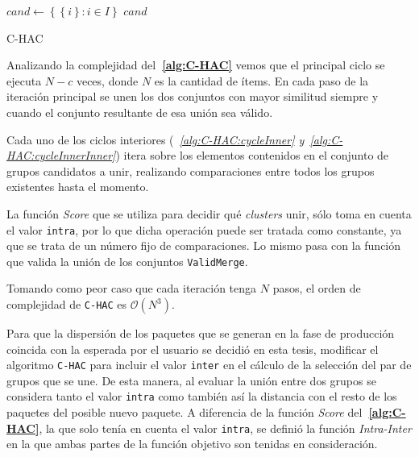 \begin{center}
	\begin{algorithm}[H]
	\DontPrintSemicolon
	\SetAlgoLined
		$cand \leftarrow \left\{\left\{i\right\}: i \in I\right\}$\; \label{alg:C-HAC:init}
		\Return $cand$\;
	\caption{C-HAC}\label{alg:C-HAC}
	\end{algorithm}
\end{center}

Analizando la complejidad del\textbf{~\autoref{alg:C-HAC}} vemos que el principal ciclo se ejecuta $N - c$ veces, donde $N$ es la cantidad de ítems. En cada paso de la iteración principal se unen los dos conjuntos con mayor similitud siempre y cuando el conjunto resultante de esa unión sea válido.

Cada uno de los ciclos interiores (\textit{~\autoref{alg:C-HAC:cycleInner} y~\autoref{alg:C-HAC:cycleInnerInner}}) itera sobre los elementos contenidos en el conjunto de grupos candidatos a unir, realizando comparaciones entre todos los grupos existentes hasta el momento. 

La función \textit{Score} que se utiliza para decidir qué {\em clusters} unir, sólo toma en cuenta el valor \texttt{intra}, por lo que dicha operación puede ser tratada como constante, ya que se trata de un número fijo de comparaciones. Lo mismo pasa con la función que valida la unión de los conjuntos \texttt{ValidMerge}.

Tomando como peor caso que cada iteración tenga $N$ pasos, el orden de complejidad de \texttt{C-HAC} es $\mathcal{O}(N^{3})$. 

Para que la dispersión de los paquetes que se generan en la fase de producción coincida con la esperada por el usuario se decidió en esta tesis, modificar el algoritmo \texttt{C-HAC} para incluir el valor \texttt{inter} en el cálculo de la selección del par de grupos que se une. De esta manera, al evaluar la unión entre dos grupos se considera tanto el valor \texttt{intra} como también así la distancia con el resto de los paquetes del posible nuevo paquete. A diferencia de la función \textit{Score} del\textbf{~\autoref{alg:C-HAC}}, la que solo tenía en cuenta el valor \texttt{intra}, se definió la función \textit{Intra-Inter} en la que ambas partes de la función objetivo son tenidas en consideración. 

